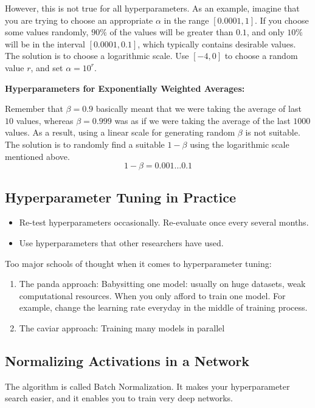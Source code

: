 However, this is not true for all hyperparameters. As an example, imagine that you are trying to choose an appropriate $\alpha$ in the range $[0.0001, 1]$.
If you choose some values randomly, $90\%$ of the values will be greater than $0.1$, and only $10\%$ will be in the interval $[0.0001, 0.1]$, which typically contains desirable values. 
The solution is to choose a logarithmic scale. 
Use $[-4, 0]$ to choose a random value $r$, and set $\alpha=10^{r}$. 

\textbf{Hyperparameters for Exponentially Weighted Averages:} 

Remember that $\beta=0.9$ basically meant that we were taking the average of last $10$ values, whereas $\beta=0.999$ was as if we were taking the average of the last $1000$ values. 
As a result, using a linear scale for generating random $\beta$ is not suitable. 
The solution is to randomly find a suitable $1-\beta$ using the logarithmic scale mentioned above. 
$$
1-\beta = 0.001 \dots 0.1
$$

\subsection{Hyperparameter Tuning in Practice}
\begin{itemize}
    \item Re-test hyperparameters occasionally. Re-evaluate once every several months.
    \item Use hyperparameters that other researchers have used. 
\end{itemize}

Too major schools of thought when it comes to hyperparameter tuning: 
\begin{enumerate}
    \item The panda approach: Babysitting one model: usually on huge datasets, weak computational resources. When you only afford to train one model. For example, change the learning rate everyday in the middle of training process. 
    \item The caviar approach: Training many models in parallel
\end{enumerate}

\subsection{Normalizing Activations in a Network}
The algorithm is called Batch Normalization. It makes your hyperparameter search easier, and it enables you to train very deep networks.

